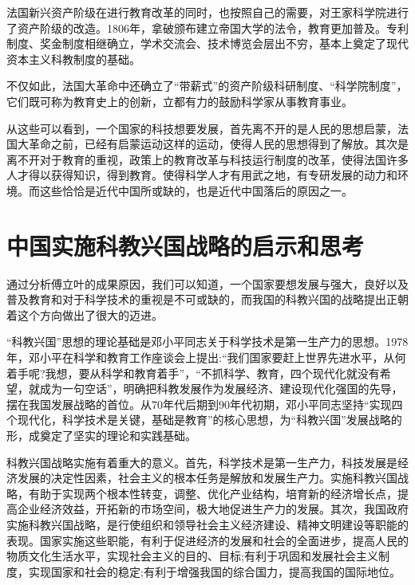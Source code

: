 \documentclass{../source/Paper}
\begin{document}
    法国新兴资产阶级在进⾏教育改⾰的同时，也按照⾃⼰的需要，对王家科学院进⾏了资产阶级的改造。1806年，拿破颁布建⽴帝国⼤学的法令，教育更加普及。专利制度、奖⾦制度相继确⽴，学术交流会、技术博览会层出不穷，基本上奠定了现代资本主义科教制度的基础。

    不仅如此，法国⼤⾰命中还确⽴了“带薪式”的资产阶级科研制度、“科学院制度”，它们既可称为教育史上的创新，⽴都有⼒的⿎励科学家从事教育事业。

    从这些可以看到，一个国家的科技想要发展，首先离不开的是人民的思想启蒙，法国大革命之前，已经有启蒙运动这样的运动，使得人民的思想得到了解放。其次是离不开对于教育的重视，政策上的教育改革与科技运行制度的改革，使得法国许多人才得以获得知识，得到教育。使得科学人才有用武之地，有专研发展的动力和环境。而这些恰恰是近代中国所或缺的，也是近代中国落后的原因之一。


    \section{中国实施科教兴国战略的启示和思考}

    通过分析傅立叶的成果原因，我们可以知道，一个国家要想发展与强大，良好以及普及教育和对于科学技术的重视是不可或缺的，而我国的科教兴国的战略提出正朝着这个方向做出了很大的迈进。

    “科教兴国”思想的理论基础是邓小平同志关于科学技术是第一生产力的思想。1978年，邓小平在科学和教育工作座谈会上提出:“我们国家要赶上世界先进水平，从何着手呢?我想，要从科学和教育着手”，“不抓科学、教育，四个现代化就没有希望，就成为一句空话”，明确把科教发展作为发展经济、建设现代化强国的先导，摆在我国发展战略的首位。从70年代后期到90年代初期，邓小平同志坚持“实现四个现代化，科学技术是关键，基础是教育”的核心思想，为“科教兴国”发展战略的形，成奠定了坚实的理论和实践基础。

    科教兴国战略实施有着重大的意义。首先，科学技术是第一生产力，科技发展是经济发展的决定性因素，社会主义的根本任务是解放和发展生产力。实施科教兴国战略，有助于实现两个根本性转变，调整、优化产业结构，培育新的经济增长点，提高企业经济效益，开拓新的市场空间，极大地促进生产力的发展。其次，我国政府实施科教兴国战略，是行使组织和领导社会主义经济建设、精神文明建设等职能的表现。国家实施这些职能，有利于促进经济的发展和社会的全面进步，提高人民的物质文化生活水平，实现社会主义的目的、目标;有利于巩固和发展社会主义制度，实现国家和社会的稳定;有利于增强我国的综合国力，提高我国的国际地位。
\end{document}
